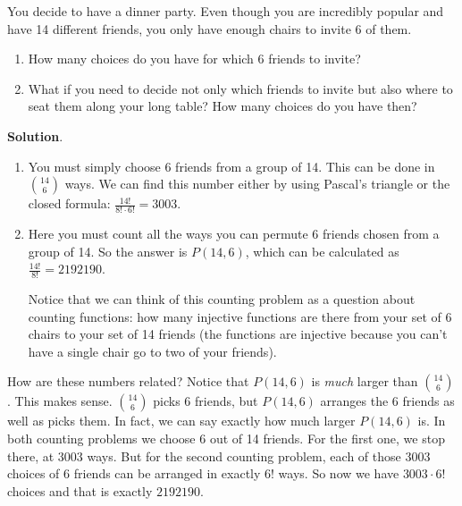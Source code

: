 \documentclass[11pt,]{book}
\theoremstyle{ptxplainnotitle}
\theoremstyle{ptxplaintitle}
\theoremstyle{ptxdefinitionnotitle}
\theoremstyle{ptxdefinitiontitle}
\theoremstyle{ptxdefinitionnotitle}
\theoremstyle{ptxdefinitiontitle}
\theoremstyle{ptxdefinitionnotitle}
\theoremstyle{ptxdefinitiontitle}
\theoremstyle{ptxdefinitiontitlenonumber}
\theoremstyle{ptxdefinitiontitlenonumber}
\numberwithin{equation}{chapter}
\begin{document}
\begin{example}\label{example-46}
\hypertarget{p-1541}{}%
You decide to have a dinner party. Even though you are incredibly popular and have 14 different friends, you only have enough chairs to invite 6 of them.%
\par
\hypertarget{p-1542}{}%
\leavevmode%
\begin{enumerate}
\item\hypertarget{li-665}{}\hypertarget{p-1543}{}%
How many choices do you have for which 6 friends to invite?%
\item\hypertarget{li-666}{}\hypertarget{p-1544}{}%
What if you need to decide not only which friends to invite but also where to seat them along your long table?  How many choices do you have then?%
\end{enumerate}
%
\par\smallskip%
\noindent\textbf{Solution}.\hypertarget{solution-203}{}\quad%
\hypertarget{p-1545}{}%
\leavevmode%
\begin{enumerate}
\item\hypertarget{li-667}{}\hypertarget{p-1546}{}%
You must simply choose 6 friends from a group of 14.  This can be done in \({14 \choose 6}\) ways.  We can find this number either by using Pascal's triangle or the closed formula: \(\frac{14!}{8!\cdot 6!} = 3003\).%
\item\hypertarget{li-668}{}\hypertarget{p-1547}{}%
Here you must count all the ways you can permute 6 friends chosen from a group of 14.  So the answer is \(P(14, 6)\), which can be calculated as \(\frac{14!}{8!} = 2192190\).%
\par
\hypertarget{p-1548}{}%
Notice that we can think of this counting problem as a question about counting functions: how many injective functions are there from your set of 6 chairs to your set of 14 friends (the functions are injective because you can't have a single chair go to two of your friends).%
\end{enumerate}
%
\par
\hypertarget{p-1549}{}%
How are these numbers related? Notice that \(P(14,6)\) is \emph{much} larger than \({14 \choose 6}\). This makes sense. \({14 \choose 6}\) picks 6 friends, but \(P(14,6)\) arranges the 6 friends as well as picks them. In fact, we can say exactly how much larger \(P(14,6)\) is. In both counting problems we choose 6 out of 14 friends. For the first one, we stop there, at 3003 ways. But for the second counting problem, each of those 3003 choices of 6 friends can be arranged in exactly \(6!\) ways. So now we have \(3003\cdot 6!\) choices and that is exactly \(2192190\).%

\end{example}
\end{document}
